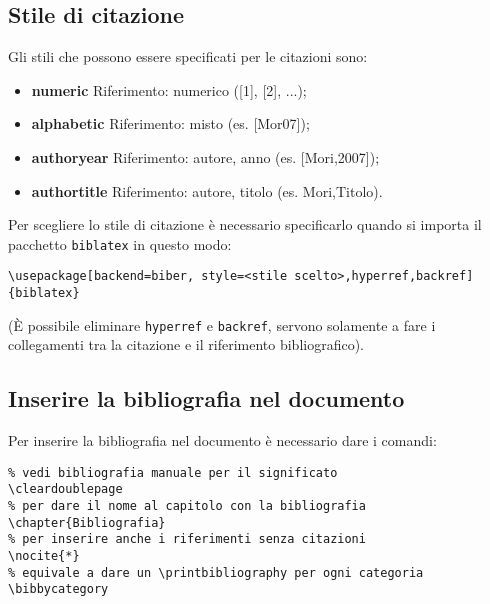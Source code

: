 \subsection{Stile di citazione}
Gli stili che possono essere specificati per le citazioni sono:
\begin{itemize}
    \item \textbf{numeric} Riferimento: numerico ([1], [2], ...);
    \item \textbf{alphabetic} Riferimento: misto (es. [Mor07]);
    \item \textbf{authoryear} Riferimento: autore, anno (es. [Mori,2007]);
    \item \textbf{authortitle} Riferimento: autore, titolo (es. Mori,Titolo).
\end{itemize}
Per scegliere lo stile di citazione è necessario specificarlo quando si importa
il pacchetto \verb!biblatex! in questo modo:
\begin{lstlisting}
\usepackage[backend=biber, style=<stile scelto>,hyperref,backref]{biblatex}
\end{lstlisting}
(È possibile eliminare \texttt{hyperref} e \texttt{backref}, servono solamente 
a fare i collegamenti tra la citazione e il riferimento bibliografico).

\subsection{Inserire la bibliografia nel documento}
Per inserire la bibliografia nel documento è necessario dare i comandi:
\begin{lstlisting}
% vedi bibliografia manuale per il significato
\cleardoublepage 
% per dare il nome al capitolo con la bibliografia
\chapter{Bibliografia} 
% per inserire anche i riferimenti senza citazioni
\nocite{*}
% equivale a dare un \printbibliography per ogni categoria
\bibbycategory
\end{lstlisting}